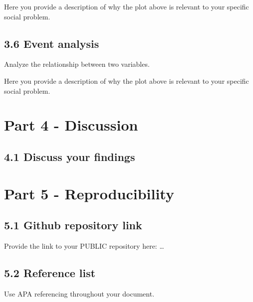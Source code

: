 \documentclass[
]{article}
\begin{document}
Here you provide a description of why the plot above is relevant to your
specific social problem.

\subsection{3.6 Event analysis}\label{event-analysis}

Analyze the relationship between two variables.

Here you provide a description of why the plot above is relevant to your
specific social problem.

\section{Part 4 - Discussion}\label{part-4---discussion}

\subsection{4.1 Discuss your findings}\label{discuss-your-findings}

\section{Part 5 - Reproducibility}\label{part-5---reproducibility}

\subsection{5.1 Github repository link}\label{github-repository-link}

Provide the link to your PUBLIC repository here: \ldots{}

\subsection{5.2 Reference list}\label{reference-list}

Use APA referencing throughout your document.
\end{document}

